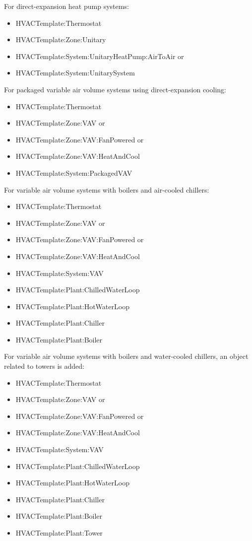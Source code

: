 For direct-expansion heat pump systems:

\begin{itemize}
\item
  HVACTemplate:Thermostat
\item
  HVACTemplate:Zone:Unitary
\item
  HVACTemplate:System:UnitaryHeatPump:AirToAir or
\item
  HVACTemplate:System:UnitarySystem
\end{itemize}

For packaged variable air volume systems using direct-expansion cooling:

\begin{itemize}
\item
  HVACTemplate:Thermostat
\item
  HVACTemplate:Zone:VAV or
\item
  HVACTemplate:Zone:VAV:FanPowered or
\item
  HVACTemplate:Zone:VAV:HeatAndCool
\item
  HVACTemplate:System:PackagedVAV
\end{itemize}

For variable air volume systems with boilers and air-cooled chillers:

\begin{itemize}
\item
  HVACTemplate:Thermostat
\item
  HVACTemplate:Zone:VAV or
\item
  HVACTemplate:Zone:VAV:FanPowered or
\item
  HVACTemplate:Zone:VAV:HeatAndCool
\item
  HVACTemplate:System:VAV
\item
  HVACTemplate:Plant:ChilledWaterLoop
\item
  HVACTemplate:Plant:HotWaterLoop
\item
  HVACTemplate:Plant:Chiller
\item
  HVACTemplate:Plant:Boiler
\end{itemize}

For variable air volume systems with boilers and water-cooled chillers, an object related to towers is added:

\begin{itemize}
\item
  HVACTemplate:Thermostat
\item
  HVACTemplate:Zone:VAV or
\item
  HVACTemplate:Zone:VAV:FanPowered or
\item
  HVACTemplate:Zone:VAV:HeatAndCool
\item
  HVACTemplate:System:VAV
\item
  HVACTemplate:Plant:ChilledWaterLoop
\item
  HVACTemplate:Plant:HotWaterLoop
\item
  HVACTemplate:Plant:Chiller
\item
  HVACTemplate:Plant:Boiler
\item
  HVACTemplate:Plant:Tower
\end{itemize}

